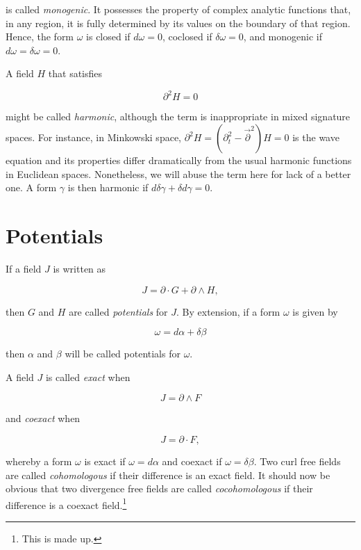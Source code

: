 \documentclass{article}
\begin{document}
is called \emph{monogenic}. It possesses the property of complex analytic functions that, in any region, it is fully determined by its values on the boundary of that region. Hence, the form $\omega$ is closed if $d \omega = 0$, coclosed if $\delta \omega = 0$, and monogenic if $d \omega = \delta \omega = 0$.

A field $H$ that satisfies

\begin{equation}
  \partial^2 H = 0
\end{equation}

might be called \emph{harmonic}, although the term is inappropriate in mixed signature spaces. For instance, in Minkowski space, $\partial^2 H = (\partial_t^2 - \vec \partial^2) H = 0$ is the wave equation and its properties differ dramatically from the usual harmonic functions in Euclidean spaces. Nonetheless, we will abuse the term here for lack of a better one. A form $\gamma$ is then harmonic if $d \delta \gamma + \delta d \gamma = 0$.

\section{Potentials}

If a field $J$ is written as

\begin{equation}
  J = \partial \cdot G + \partial \wedge H,
\end{equation}

then $G$ and $H$ are called \emph{potentials} for $J$. By extension, if a form $\omega$ is given by

\begin{equation}
  \omega = d \alpha + \delta \beta
\end{equation}

then $\alpha$ and $\beta$ will be called potentials for $\omega$.

A field $J$ is called \emph{exact} when

\begin{equation}
  J = \partial \wedge F
\end{equation}

and \emph{coexact} when

\begin{equation}
  J = \partial \cdot F,
\end{equation}

whereby a form $\omega$ is exact if $\omega = d \alpha$ and coexact if $\omega = \delta \beta$. Two curl free fields are called \emph{cohomologous} if their difference is an exact field. It should now be obvious that two divergence free fields are called \emph{cocohomologous} if their difference is a coexact field.\footnote{This is made up.}
\end{document}
